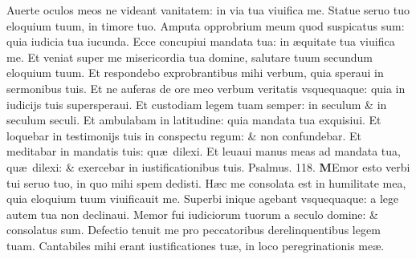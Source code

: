 \documentclass[a5paper,10pt]{book}
\def\ae{æ}
\begin{document}
\begin{multicols*}{2}
\newline \color{red} A\color{black}uerte oculos meos ne videant vanitatem: in via tua viuifica me.
\newline \color{red} S\color{black}tatue seruo tuo eloquium tuum, in timore tuo.
\newline \color{red} A\color{black}mputa opprobrium meum quod suspicatus sum: quia iudicia tua iucunda.
\newline \color{red} E\color{black}cce concupiui mandata tua: in \ae quitate tua viuifica me.
\newline \color{red} E\color{black}t veniat super me misericordia tua domine, salutare tuum secundum eloquium tuum.
\newline \color{red} E\color{black}t respondebo exprobrantibus mihi verbum, quia speraui in sermonibus tuis.
\newline \color{red} E\color{black}t ne auferas de ore meo verbum veritatis vsquequaque: quia in iudicijs tuis supersperaui.
\newline \color{red} E\color{black}t custodiam legem tuam semper: in seculum \& in seculum seculi.
\newline \color{red} E\color{black}t ambulabam in latitudine: quia mandata tua exquisiui.
\newline \color{red} E\color{black}t loquebar in testimonijs tuis in conspectu regum: \& non confundebar.
\newline \color{red} E\color{black}t meditabar in mandatis tuis: qu\ae \ dilexi.
\newline \color{red} E\color{black}t leuaui manus meas ad mandata tua, qu\ae \ dilexi: \& exercebar in iustificationibus tuis. \quad \color{red} Psalmus. \hypertarget{ps118.4}{118.} \color{black}
\vspace{-1em}
\lettrine[lines=2]{\bfseries \color{red} M}{}Emor esto verbi tui seruo tuo, in quo mihi spem dedisti.
\newline \color{red} H\color{black}\ae c me consolata est in humilitate mea, quia eloquium tuum viuificauit me.
\newline \color{red} S\color{black}uperbi inique agebant vsquequaque: a lege autem tua non declinaui.
\newline \color{red} M\color{black}emor fui iudiciorum tuorum a seculo domine: \& consolatus sum.
\newline \color{red} D\color{black}efectio tenuit me pro peccatoribus derelinquentibus legem tuam.
\newline \color{red} C\color{black}antabiles mihi erant iustificationes tu\ae , in loco peregrinationis me\ae .

\end{multicols*}
\end{document}
